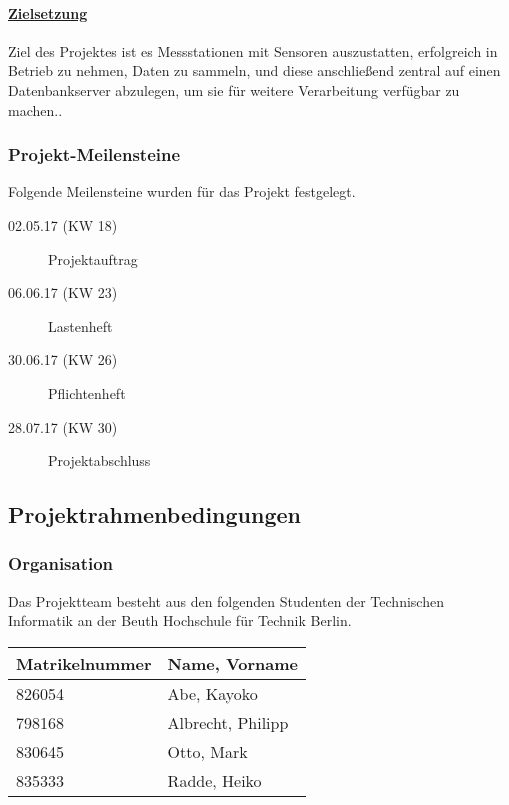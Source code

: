 \paragraph{\uline{Zielsetzung}}
%
Ziel des Projektes ist es Messstationen mit Sensoren auszustatten, erfolgreich in Betrieb zu nehmen, Daten zu sammeln, und diese anschließend zentral auf einen Datenbankserver abzulegen, um sie für weitere Verarbeitung verfügbar zu machen..

\subsubsection{Projekt-Meilensteine}

Folgende Meilensteine wurden f\"ur das Projekt festgelegt.

\begin{description}
	\item[02.05.17 (KW 18)] Projektauftrag
	\item[06.06.17 (KW 23)] Lastenheft
	\item[30.06.17 (KW 26)] Pflichtenheft
	\item[28.07.17 (KW 30)] Projektabschluss
\end{description}

\subsection{Projektrahmenbedingungen}

\subsubsection{Organisation}


Das Projektteam besteht aus den folgenden Studenten der Technischen Informatik an der Beuth Hochschule für Technik Berlin.

\begin{table}[H]
	\centering
	\begin{tabular}{ |l|l| }
		\hline  %
		\rowcolor[gray]{.8}%
		\rule{0pt}{18pt}%
		\textbf{Matrikelnummer} & \textbf{Name, Vorname} \\
		\hline  %
		826054 & Abe, Kayoko \\
		\hline
		798168 & Albrecht, Philipp \\
		\hline
		830645 & Otto, Mark \\
		\hline
		835333 & Radde, Heiko \\
		\hline
	\end{tabular}
\end{table}

